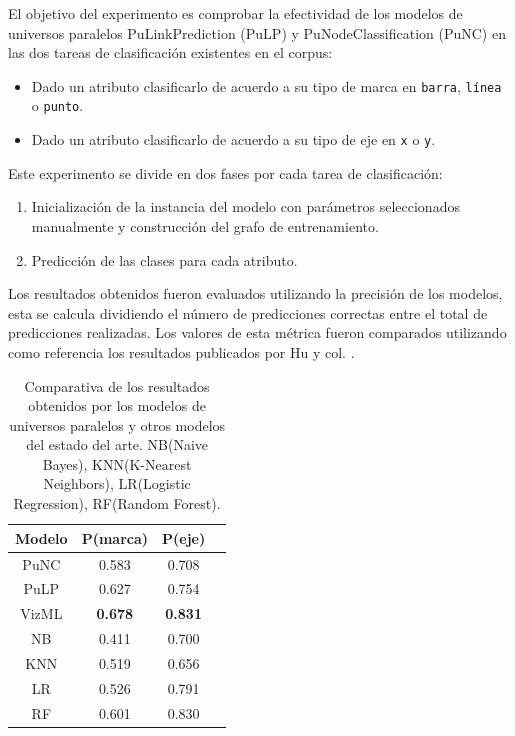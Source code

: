     El objetivo del experimento es comprobar la efectividad de los modelos
    de universos paralelos PuLinkPrediction (PuLP) y PuNodeClassification (PuNC)
    en las dos tareas de clasificaci\'on existentes
    en el corpus: \begin{itemize}
        \item Dado un atributo clasificarlo de acuerdo a su tipo de marca en \texttt{barra}, \texttt{l\'inea} o \texttt{punto}.
        \item Dado un atributo clasificarlo de acuerdo a su tipo de eje en \texttt{x} o \texttt{y}.
    \end{itemize}
    Este experimento se divide en dos fases por cada tarea de clasificaci\'on:
    \begin{enumerate}
        \item Inicializaci\'on de la instancia del modelo con par\'ametros seleccionados manualmente y construcci\'on del
        grafo de entrenamiento.
        \item Predicci\'on de las clases para cada atributo.
    \end{enumerate}

    Los resultados obtenidos fueron evaluados utilizando la precisi\'on de los modelos, esta
    se calcula dividiendo
    el n\'umero de predicciones correctas entre el total de predicciones realizadas. Los valores
    de esta m\'etrica fueron comparados utilizando como referencia los
    resultados publicados por Hu y col. \cite{hu2019vizml}.

    \begin{table}[H]
        \centering
        \begin{tabular}{ |c|c|c|c|}
            \hline
            \bf Modelo  & \bf P(marca) & \bf P(eje)\\
            \hline
            PuNC  & 0.583& 0.708\\
            PuLP  & 0.627 & 0.754\\
            \hline
        
            VizML  & \bf 0.678 & \bf 0.831\\
            \hline
            NB  & 0.411 & 0.700 \\
            KNN  & 0.519 & 0.656\\
            LR  & 0.526 & 0.791\\
            RF  &  0.601& 0.830\\
            \hline

        \end{tabular}
        \caption{Comparativa de los resultados obtenidos por los modelos de universos paralelos y otros modelos del estado del arte.
        NB(Naive Bayes), KNN(K-Nearest Neighbors), LR(Logistic Regression), RF(Random Forest).
        }
    \end{table}

